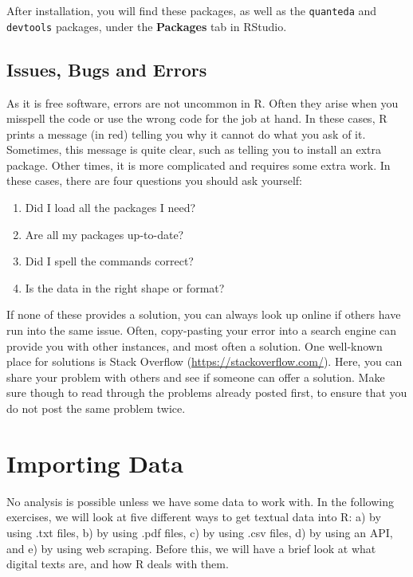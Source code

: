 \documentclass[
]{article}
\providecommand{\tightlist}{%
  \setlength{\itemsep}{0pt}\setlength{\parskip}{0pt}}
\begin{document}
After installation, you will find these packages, as well as the \texttt{quanteda} and \texttt{devtools} packages, under the \textbf{Packages} tab in RStudio.

\hypertarget{issues-bugs-and-errors}{%
\subsection{Issues, Bugs and Errors}\label{issues-bugs-and-errors}}

As it is free software, errors are not uncommon in R. Often they arise when you misspell the code or use the wrong code for the job at hand. In these cases, R prints a message (in red) telling you why it cannot do what you ask of it. Sometimes, this message is quite clear, such as telling you to install an extra package. Other times, it is more complicated and requires some extra work. In these cases, there are four questions you should ask yourself:

\begin{enumerate}
\def\labelenumi{\arabic{enumi}.}
\tightlist
\item
  Did I load all the packages I need?
\item
  Are all my packages up-to-date?
\item
  Did I spell the commands correct?
\item
  Is the data in the right shape or format?
\end{enumerate}

If none of these provides a solution, you can always look up online if others have run into the same issue. Often, copy-pasting your error into a search engine can provide you with other instances, and most often a solution. One well-known place for solutions is Stack Overflow (\url{https://stackoverflow.com/}). Here, you can share your problem with others and see if someone can offer a solution. Make sure though to read through the problems already posted first, to ensure that you do not post the same problem twice.

\hypertarget{importing-data}{%
\section{Importing Data}\label{importing-data}}

No analysis is possible unless we have some data to work with. In the following exercises, we will look at five different ways to get textual data into R: a) by using .txt files, b) by using .pdf files, c) by using .csv files, d) by using an API, and e) by using web scraping. Before this, we will have a brief look at what digital texts are, and how R deals with them.
\end{document}
